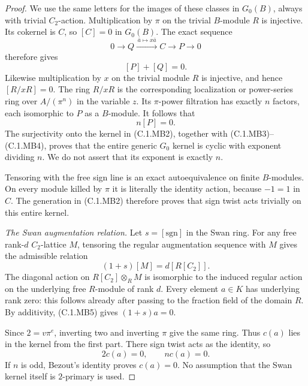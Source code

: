 \begin{proof}
We use the same letters for the images of these
classes in $G_0(B)$, always with trivial $C_2$-action.
Multiplication by $\pi$ on the trivial $B$-module
$R$ is injective.  Its cokernel is $C$, so $[C]=0$
in $G_0(B)$.
The exact sequence
\[
 0\longrightarrow Q\xrightarrow{\,\bar a\mapsto x\bar a\,}
 C\longrightarrow P\longrightarrow0
\]
therefore gives
\[
                         [P]+[Q]=0.                 \tag{C.1.MB3}
\]
Likewise multiplication by $x$ on the trivial
module $R$ is injective, and hence $[R/xR]=0$.
The ring $R/xR$ is the corresponding localization
or power-series ring over $A/(\pi^n)$ in the
variable $z$.
Its $\pi$-power filtration has exactly $n$ factors,
each isomorphic to $P$ as a $B$-module.
It follows that
\[
                              n[P]=0.                \tag{C.1.MB4}
\]
The surjectivity onto the kernel in (C.1.MB2),
together with (C.1.MB3)--(C.1.MB4), proves that
the entire generic $G_0$ kernel is cyclic with
exponent dividing $n$.  We do not assert that
its exponent is exactly $n$.

Tensoring with the free sign line is an exact
autoequivalence on finite $B$-modules.
On every module killed by $\pi$ it is literally
the identity action, because $-1=1$ in $C$.
The generation in (C.1.MB2) therefore proves
that sign twist acts trivially on this entire kernel.

\emph{The Swan augmentation relation.}
Let $s=[\mathrm{sgn}]$ in the Swan ring.
For any free rank-$d$ $C_2$-lattice $M$,
tensoring the regular augmentation sequence with
$M$ gives the admissible relation
\[
                         (1+s)[M]=d[R[C_2]].         \tag{C.1.MB5}
\]
The diagonal action on $R[C_2]\otimes_R M$ is
isomorphic to the induced regular action on the
underlying free $R$-module of rank $d$.
Every element $a\in K$ has underlying rank zero:
this follows already after passing to the fraction
field of the domain $R$.
By additivity, (C.1.MB5) gives $(1+s)a=0$.

Since $2=v\pi^e$, inverting two and inverting
$\pi$ give the same ring.
Thus $c(a)$ lies in the kernel from the first part.
There sign twist acts as the identity, so
\[
                         2c(a)=0,
                         \qquad nc(a)=0.             \tag{C.1.MB6}
\]
If $n$ is odd, Bezout's identity proves $c(a)=0$.
No assumption that the Swan kernel itself is
$2$-primary is used.


\end{proof}
